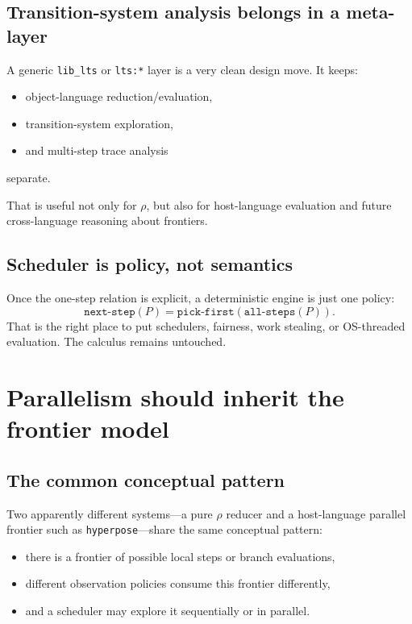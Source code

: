 \documentclass[11pt]{article}
\begin{document}
\subsection{Transition-system analysis belongs in a meta-layer}

A generic \texttt{lib\_lts} or \texttt{lts:*} layer is a very clean design move. It keeps:
\begin{itemize}
    \item object-language reduction/evaluation,
    \item transition-system exploration,
    \item and multi-step trace analysis
\end{itemize}
separate.

That is useful not only for $\rho$, but also for host-language evaluation and future cross-language reasoning about frontiers.

\subsection{Scheduler is policy, not semantics}

Once the one-step relation is explicit, a deterministic engine is just one policy:
\[
\texttt{next-step}(P) = \texttt{pick-first}(\texttt{all-steps}(P)).
\]
That is the right place to put schedulers, fairness, work stealing, or OS-threaded evaluation. The calculus remains untouched.

\section{Parallelism should inherit the frontier model}

\subsection{The common conceptual pattern}

Two apparently different systems---a pure $\rho$ reducer and a host-language parallel frontier such as \texttt{hyperpose}---share the same conceptual pattern:
\begin{itemize}
    \item there is a frontier of possible local steps or branch evaluations,
    \item different observation policies consume this frontier differently,
    \item and a scheduler may explore it sequentially or in parallel.
\end{itemize}
\end{document}
